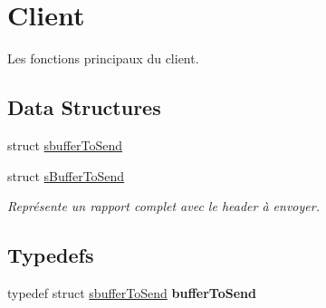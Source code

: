 \hypertarget{group__client}{}\section{Client}
\label{group__client}


Les fonctions principaux du client.  


\subsection*{Data Structures}
\begin{DoxyCompactItemize}
\item 
struct \hyperlink{structsbuffer_to_send}{sbuffer\+To\+Send}
\item 
struct \hyperlink{structs_buffer_to_send}{s\+Buffer\+To\+Send}
\begin{DoxyCompactList}\small\item\em Représente un rapport complet avec le header à envoyer. \end{DoxyCompactList}\end{DoxyCompactItemize}
\subsection*{Typedefs}
\begin{DoxyCompactItemize}
\item 
\hypertarget{group__client_ga66d0ddc08cd4b69d81f637d5c0ffdc03}{}typedef struct \hyperlink{structsbuffer_to_send}{sbuffer\+To\+Send} {\bfseries buffer\+To\+Send}\label{group__client_ga66d0ddc08cd4b69d81f637d5c0ffdc03}

\end{DoxyCompactItemize}
